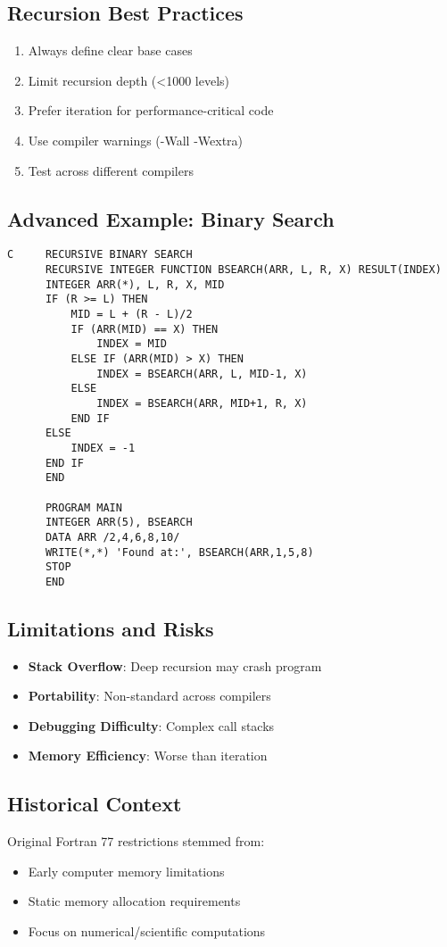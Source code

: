 \documentclass{book}
\begin{document}
\subsection*{Recursion Best Practices}
\begin{enumerate}
\item Always define clear base cases
\item Limit recursion depth (<1000 levels)
\item Prefer iteration for performance-critical code
\item Use compiler warnings (-Wall -Wextra)
\item Test across different compilers
\end{enumerate}

\subsection*{Advanced Example: Binary Search}
\begin{verbatim}
C     RECURSIVE BINARY SEARCH
      RECURSIVE INTEGER FUNCTION BSEARCH(ARR, L, R, X) RESULT(INDEX)
      INTEGER ARR(*), L, R, X, MID
      IF (R >= L) THEN
          MID = L + (R - L)/2
          IF (ARR(MID) == X) THEN
              INDEX = MID
          ELSE IF (ARR(MID) > X) THEN
              INDEX = BSEARCH(ARR, L, MID-1, X)
          ELSE
              INDEX = BSEARCH(ARR, MID+1, R, X)
          END IF
      ELSE
          INDEX = -1
      END IF
      END

      PROGRAM MAIN
      INTEGER ARR(5), BSEARCH
      DATA ARR /2,4,6,8,10/
      WRITE(*,*) 'Found at:', BSEARCH(ARR,1,5,8)
      STOP
      END
\end{verbatim}

\subsection*{Limitations and Risks}
\begin{itemize}
\item \textbf{Stack Overflow}: Deep recursion may crash program
\item \textbf{Portability}: Non-standard across compilers
\item \textbf{Debugging Difficulty}: Complex call stacks
\item \textbf{Memory Efficiency}: Worse than iteration
\end{itemize}

\subsection*{Historical Context}
Original Fortran 77 restrictions stemmed from:
\begin{itemize}
\item Early computer memory limitations
\item Static memory allocation requirements
\item Focus on numerical/scientific computations
\end{itemize}
\end{document}
